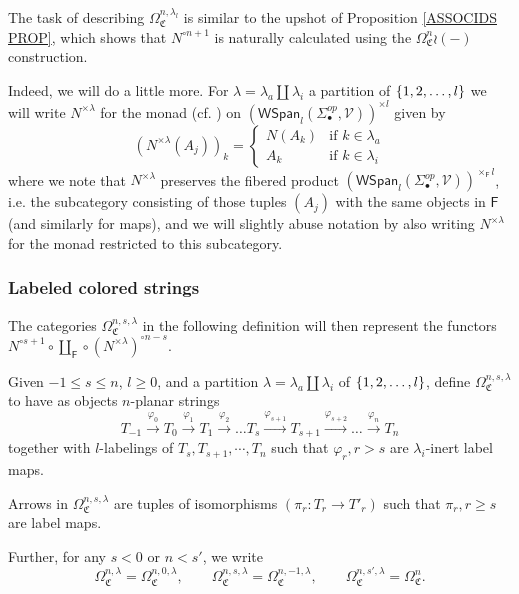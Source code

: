 \documentclass[a4paper,10pt
,draft
]{article}%
\renewcommand{\1}{\eta}%
\begin{document}
The task of describing 
$\Omega^{n,\lambda_l}_{\mathfrak{C}}$
is similar to the upshot of Proposition \ref{ASSOCIDS PROP}, which shows that
$N^{\circ n+1}$ is naturally calculated using the
$\Omega_{\mathfrak{C}}^{n} \wr (-)$ 
construction.

Indeed, we will do a little more. For $\lambda = \lambda_a \amalg \lambda_i$
a partition of $\left\{1,2,\dots,l\right\}$
we will write 
$N^{\times \lambda}$
for the monad (cf. \cite[\S 2.3]{BP_geo}) on 
$\left(\mathsf{WSpan}_l(\Sigma_{\bullet}^{op},\mathcal{V})\right)^{\times l}$
given by
\[
\left(N^{\times \lambda} (A_j)\right)_k = 
\begin{cases}
N(A_k) & \text{if } k\in \lambda_a
\\
A_k & \text{if } k\in \lambda_i
\end{cases}
\]
where we note that $N^{\times \lambda}$
preserves the fibered product
$\left(\mathsf{WSpan}_l(\Sigma_{\bullet}^{op},\mathcal{V})\right)^{\times_{\mathsf{F}} l}$,
i.e. the subcategory consisting of those tuples $(A_j)$ with the same objects in $\mathsf{F}$ (and similarly for maps), and we will slightly abuse notation by also writing 
$N^{\times \lambda}$
for the monad restricted to this subcategory.


\subsubsection{Labeled colored strings}
\label{LCS_SEC}

The categories $\Omega_{\mathfrak C}^{n,s,\lambda}$ in the following definition will then represent
the functors
$N^{\circ s+1} \circ \coprod_{\mathsf{F}} \circ \left(N^{\times \lambda}\right)^{\circ n-s}$.

 

\begin{definition}\label{CLPS DEF}
      Given $-1 \leq s \leq n$, $l \geq 0$, and a partition $\lambda = \lambda_a \amalg \lambda_i$ of $\left\{1,2,\dots,l\right\}$,
      define $\Omega_{\mathfrak C}^{n,s,\lambda}$ to have as objects
$n$-planar strings
\begin{equation}
	T_{-1} \xrightarrow{\varphi_0} T_0 \xrightarrow{\varphi_1} T_1 \xrightarrow{\varphi_2} \dots
	T_{s} \xrightarrow{\varphi_{s+1}} T_{s+1} \xrightarrow{\varphi_{s+2}}  \dots
	\xrightarrow{\varphi_n} T_n
\end{equation}
together with $l$-labelings of $T_s, T_{s+1}, \cdots, T_n$
such that
$\varphi_{r}, r>s$ are $\lambda_i$-inert label maps.

Arrows in $\Omega_{\mathfrak C}^{n,s,\lambda}$
are tuples of isomorphisms $\left(\pi_r \colon T_r \to T'_r\right)$
such that $\pi_r,r \geq s$ are label maps.

Further, for any $s<0$ or $n<s'$, we write
\[
      \Omega_{\mathfrak C}^{n,\lambda} = \Omega_{\mathfrak C}^{n,0,\lambda},
      \qquad
\Omega_{\mathfrak{C}}^{n,s,\lambda} = \Omega_{\mathfrak{C}}^{n,-1,\lambda},
\qquad
\Omega_{\mathfrak{C}}^{n,s',\lambda} = \Omega_{\mathfrak{C}}^{n}.
\]
\end{definition}
\end{document}
